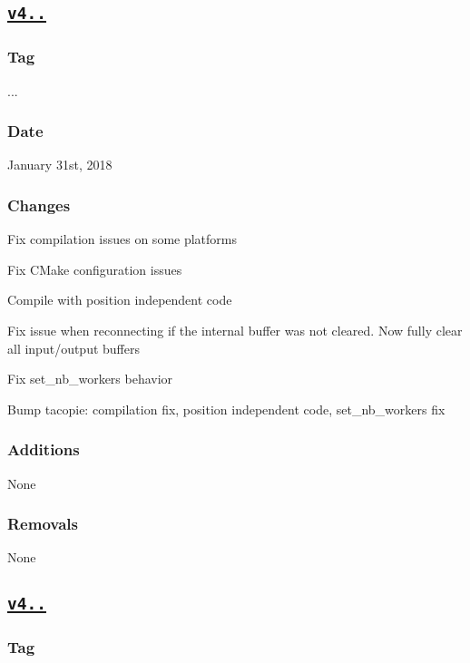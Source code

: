 \subsection*{\href{https://github.com/Cylix/cpp_redis/releases/tag/4.3.1}{\tt v4..}}

\subsubsection*{Tag}

{..}. \subsubsection*{Date}

January 31st, 2018 \subsubsection*{Changes}


\begin{DoxyItemize}
\item Fix compilation issues on some platforms
\item Fix C\+Make configuration issues
\item Compile with position independent code
\item Fix issue when reconnecting if the internal buffer was not cleared. Now fully clear all input/output buffers
\item Fix set\+\_\+nb\+\_\+workers behavior
\item Bump tacopie\+: compilation fix, position independent code, set\+\_\+nb\+\_\+workers fix \subsubsection*{Additions}
\end{DoxyItemize}

None \subsubsection*{Removals}

None

\subsection*{\href{https://github.com/Cylix/cpp_redis/releases/tag/4.3.0}{\tt v4..}}

\subsubsection*{Tag}

